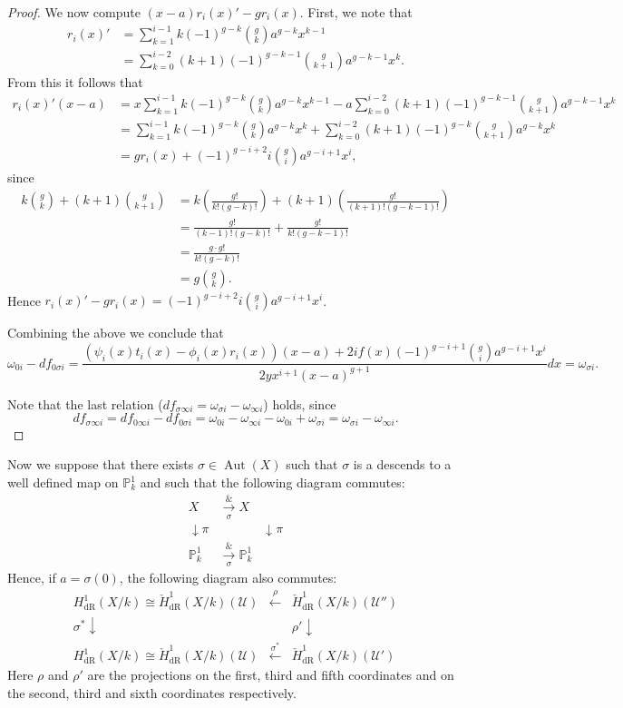 \documentclass[draft, 11pt]{article} %
\theoremstyle{plain}
\theoremstyle{remark}
\newcommand{\cU}{{\mathcal U}}
\newcommand{\derhamhone}{H_{\text {dR}}^1(X/k)}
\newcommand{\cechderhamhone}{\check{H}_{\text {dR}}^1(X/k)}
\DeclareMathOperator{\aut}{Aut}
\begin{document}
\begin{proof}
We now compute $(x-a)r_i(x)'-gr_i(x)$.
First, we note that
\begin{align*}
r_i(x)' & = \sum_{k=1}^{i-1} k (-1)^{g-k} \binom{g}{k} a^{g-k} x^{k-1} \\
& = \sum_{k=0}^{i-2} (k+1) (-1)^{g-k-1} \binom{g}{k+1}a^{g-k-1} x^k.
\end{align*}
From this it follows that
\begin{align*}
r_i(x)'(x-a) & = x \sum_{k=1}^{i-1} k (-1)^{g-k} \binom{g}{k} a^{g-k} x^{k-1} - a \sum_{k=0}^{i-2} (k+1) (-1)^{g-k-1} \binom{g}{k+1}a^{g-k-1} x^k \\
& = \sum_{k=1}^{i-1} k (-1)^{g-k} \binom{g}{k} a^{g-k} x^k  + \sum_{k=0}^{i-2} (k+1) (-1)^{g-k} \binom{g}{k+1}a^{g-k} x^k \\
& = gr_i(x) + (-1)^{g-i+2}i \binom{g}{i}a^{g-i+1}x^i,
\end{align*}
since
\begin{align*}
k\binom{g}{k} + (k+1)\binom{g}{k+1} & = k \left( \frac{g!}{k!(g-k)!} \right) + (k+1) \left( \frac{g!}{(k+1)!(g-k-1)!} \right) \\
& = \frac{g!}{(k-1)!(g-k)!} + \frac{g!}{k!(g-k-1)!} \\
& = \frac{g\cdot g!}{k!(g-k)!} \\
& = g \binom{g}{k}.
\end{align*}
Hence $r_i(x)'-gr_i(x)= (-1)^{g-i+2}i\binom{g}{i} a^{g-i+1}x^i$. 

Combining the above we conclude that
\[
\omega_{0 i } - df_{0\sigma i} =  \frac{(\psi_i(x)t_i(x) - \phi_i(x)r_i(x))(x-a) + 2if(x)(-1)^{g-i+1}\binom{g}{i} a^{g-i+1}x^i}{2yx^{i+1}(x-a)^{g+1}}dx= \omega_{\sigma i}.
\]

Note that the last relation ($df_{\sigma \infty i} = \omega_{\sigma i} - \omega_{\infty i}$) holds, since 
\[
df_{\sigma \infty i} = df_{0 \infty i} - df_{0 \sigma i} = \omega_{0 i} - \omega_{\infty i } - \omega_{0 i} + \omega_{\sigma i} = \omega_{\sigma i} - \omega_{\infty i}.
\]
\end{proof}

Now we suppose that there exists $\sigma \in \aut(X)$ such that $\sigma$ is a descends to a well defined map on $\mathbb P_k^1$ and such that the following diagram commutes:
\[
\begin{array}{ccc}
X & \xrightarrow[\sigma] & X \\
\downarrow\pi & & \downarrow\pi \\
\mathbb P^1_k & \xrightarrow[\sigma] & \mathbb P_k^1
\end{array}
\]
Hence, if $a = \sigma(0)$, the following diagram also commutes:
\[
\begin{array}{ccc}
\derhamhone \cong \cechderhamhone(\cU)  & \xleftarrow{\rho} & \cechderhamhone(\cU'')  \\
\sigma^*\downarrow & ~ & \rho'\downarrow  \\
\derhamhone \cong \cechderhamhone(\cU)  & \xleftarrow{\sigma^*} & \cechderhamhone(\cU')
\end{array}
\]
Here $\rho$ and $\rho'$ are the projections on the first, third and fifth coordinates and on the second, third and sixth coordinates respectively.
\end{document}
